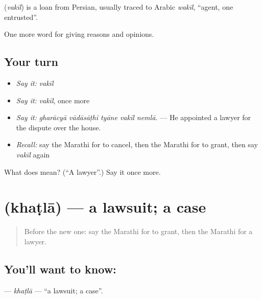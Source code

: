 \begin{cousinweb}
\textbf{} (\emph{vakīl}) is a loan from Persian, usually traced to Arabic \emph{wakīl}, \textquotedblleft{}agent, one entrusted\textquotedblright{}.
\end{cousinweb}

\begin{grammarlens}[title={What you've built}]
One more word for giving reasons and opinions.
\end{grammarlens}

\subsection*{Your turn}
\begin{itemize}
\raggedright
  \item \emph{Say it:} \emph{vakīl}
  \item \emph{Say it:} \emph{vakīl}, once more
  \item \emph{Say it:} \emph{gharācyā vādāsāṭhī tyāne vakīl nemlā.} — He appointed a lawyer for the dispute over the house.
  \item \emph{Recall:} say the Marathi for to cancel, then the Marathi for to grant, then say \emph{vakīl} again
\end{itemize}

\begin{tcolorbox}[breakable,colback=teal!4,colframe=teal!35!black,title={Before you move on}]
What does  mean? (\textquotedblleft{}A lawyer\textquotedblright{}.) Say it once more.
\end{tcolorbox}
\section[\texorpdfstring{\mr{खटला} (khaṭlā)}{खटला (khaṭlā)}]{ (khaṭlā) — a lawsuit; a case}

\label{lesson:MR-C359-khatla}



\begin{quote}
Before the new one: say the Marathi for to grant, then the Marathi for a lawyer.
\end{quote}

\subsection*{You'll want to know: }
\textbf{} — \emph{khaṭlā} — \textquotedblleft{}a lawsuit; a case\textquotedblright{}.


